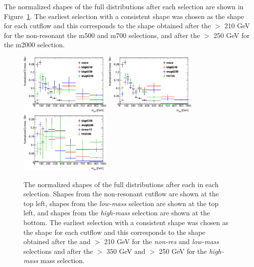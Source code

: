 The normalized shapes of the full \mbb distributions after each 
selection are shown in Figure~\ref{fig:mbbShapes}. The earliest selection with a consistent shape was chosen as the
shape for each cutflow and this corresponds to the shape obtained
after the  \ptbb $>$ 210 GeV for the non-resonant the m500 and m700  selections,  and after the  \ptww $>$ 250 GeV for the m2000 selection.

\begin{figure}[h!]
\begin{center}
\includegraphics[width=0.4\textwidth]{figures/multijet/reOptNonRes_mbbShape_individualCuts_elmu}
\includegraphics[width=0.4\textwidth]{figures/multijet/reOpt700_mbbShape_individualCuts_elmu}
\includegraphics[width=0.4\textwidth]{figures/multijet/reOpt2000_mbbShape_individualCuts_elmu}
\end{center}

\caption[The normalized shapes of the full \mbb distributions]{The normalized shapes of the full \mbb distributions after
  each in each selection. Shapes from the non-resonant cutflow are
  shown at the top left, shapes from the \emph{low-mass} selection are shown
  at the top left, and shapes from the \emph{high-mass} selection are shown
  at the bottom. The earliest selection with a consistent shape
  was chosen as the shape for each cutflow and this corresponds to the
  shape obtained after the \mww and \ptbb $>$ 210 GeV for the
  \emph{non-res} and \emph{low-mass} selections and after the \ptbb $>$ 350 GeV
  and \ptww $>$ 250 GeV for the \emph{high-mass} mass selection.} \label{fig:mbbShapes}
\end{figure}


